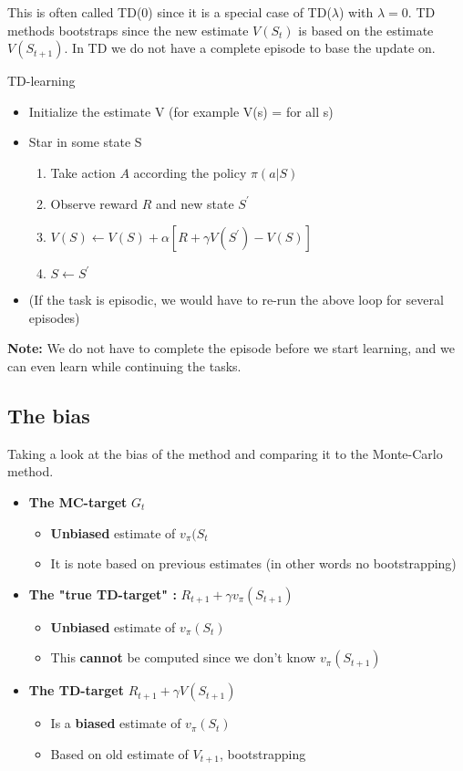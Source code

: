 This is often called TD(0) since it is a special case of TD($\lambda$) with $\lambda = 0$. TD methods bootstraps since the new estimate $V(S_t)$ is based on the estimate $V(S_{t+1})$. In TD we do not have a complete episode to base the update on. 


\begin{wbox}{TD-learning}
\begin{itemize}
	\item Initialize the estimate V (for example V(s) = for all s)
	\item Star in some state S
	\begin{enumerate}
		\item Take action $A$ according the policy $\pi (a|S)$
		\item Observe reward $R$ and new state $S^{\prime}$
		\item $V(S) \leftarrow V(S) + \alpha [R + \gamma V(S^{\prime}) - V(S)]$
		\item $S \leftarrow S^{\prime}$
	\end{enumerate}
	\item (If the task is episodic, we would have to re-run the above loop for several episodes)
\end{itemize}

\textbf{Note: } We do not have to complete the episode before we start learning, and we can even learn while continuing the tasks. 
\end{wbox}

\subsection*{The bias}
Taking a look at the bias of the method and comparing it to the Monte-Carlo method. 

\begin{itemize}
	\item \textbf{The MC-target} $G_t$
	\begin{itemize}
		\item \textbf{Unbiased} estimate of $v_\pi(S_t$
		\item It is note based on previous estimates (in other words no bootstrapping)
	\end{itemize}
	\item \textbf{The "true TD-target" : } $R_{t+1} + \gamma v_\pi(S_{t+1})$
	\begin{itemize}
		\item \textbf{Unbiased} estimate of $v_\pi(S_t)$
		\item This \textbf{cannot} be computed since we don't know $v_\pi(S_{t+1})$
	\end{itemize}
	\item \textbf{The TD-target} $R_{t+1} + \gamma V(S_{t+1})$
	\begin{itemize}
		\item Is a \textbf{biased} estimate of  $v_\pi(S_t)$
		\item Based on old estimate of $V_{t+1}$, bootstrapping 
	\end{itemize}
\end{itemize}


